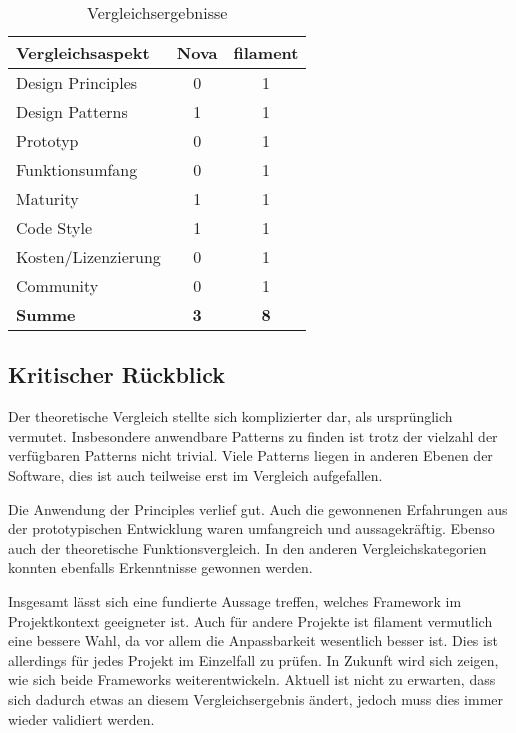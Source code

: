 \begin{table}[h!]
    \centering
    \caption{Vergleichsergebnisse}
    \label{tab:vergleichsergebnisse}
    \begin{tabular}{|l|c|c|}
        \hline
        \textbf{Vergleichsaspekt} & \textbf{Nova} & \textbf{filament} \\ \hline
        Design Principles         & 0             & 1                 \\ \hline
        Design Patterns           & 1             & 1                 \\ \hline
        Prototyp                  & 0             & 1                 \\ \hline
        Funktionsumfang           & 0             & 1                 \\ \hline
        Maturity                  & 1             & 1                 \\ \hline
        Code Style                & 1             & 1                 \\ \hline
        Kosten/Lizenzierung       & 0             & 1                 \\ \hline
        Community                 & 0             & 1                 \\ \hline
        \textbf{Summe}            & \textbf{3}    & \textbf{8}        \\ \hline
    \end{tabular}
\end{table}

\newpage

\subsection{Kritischer Rückblick}
Der theoretische Vergleich stellte sich komplizierter dar, als ursprünglich vermutet.
Insbesondere anwendbare Patterns zu finden ist trotz der vielzahl der verfügbaren Patterns nicht trivial.
Viele Patterns liegen in anderen Ebenen der Software, dies ist auch teilweise erst im Vergleich aufgefallen.

Die Anwendung der Principles verlief gut.
Auch die gewonnenen Erfahrungen aus der prototypischen Entwicklung waren umfangreich und aussagekräftig.
Ebenso auch der theoretische Funktionsvergleich.
In den anderen Vergleichskategorien konnten ebenfalls Erkenntnisse gewonnen werden.

Insgesamt lässt sich eine fundierte Aussage treffen, welches Framework im Projektkontext geeigneter ist.
Auch für andere Projekte ist filament vermutlich eine bessere Wahl, da vor allem die Anpassbarkeit wesentlich besser ist.
Dies ist allerdings für jedes Projekt im Einzelfall zu prüfen.
In Zukunft wird sich zeigen, wie sich beide Frameworks weiterentwickeln.
Aktuell ist nicht zu erwarten, dass sich dadurch etwas an diesem Vergleichsergebnis ändert, jedoch muss dies immer wieder validiert werden.

